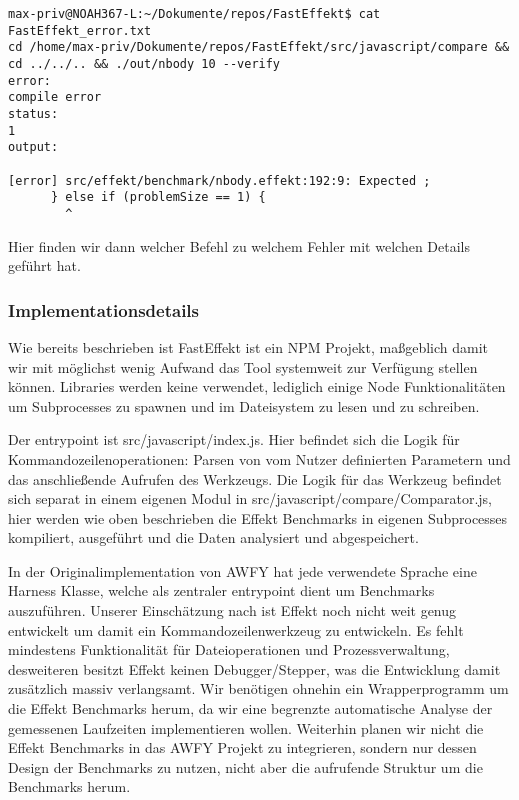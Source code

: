 \begin{lstlisting}
max-priv@NOAH367-L:~/Dokumente/repos/FastEffekt$ cat FastEffekt_error.txt 
cd /home/max-priv/Dokumente/repos/FastEffekt/src/javascript/compare && cd ../../.. && ./out/nbody 10 --verify 
error:
compile error
status:
1
output:

[error] src/effekt/benchmark/nbody.effekt:192:9: Expected ;
      } else if (problemSize == 1) {
        ^
\end{lstlisting}
Hier finden wir dann welcher Befehl zu welchem Fehler mit welchen Details geführt hat.

\subsubsection{Implementationsdetails}
Wie bereits beschrieben ist FastEffekt ist ein NPM Projekt, maßgeblich damit wir mit möglichst wenig Aufwand das Tool systemweit zur Verfügung stellen können.
Libraries werden keine verwendet, lediglich einige Node Funktionalitäten um Subprocesses zu spawnen und im Dateisystem zu lesen und zu schreiben.

Der entrypoint ist src/javascript/index.js. Hier befindet sich die Logik für Kommandozeilenoperationen: Parsen von vom Nutzer definierten Parametern und das anschließende Aufrufen des Werkzeugs.
Die Logik für das Werkzeug befindet sich separat in einem eigenen Modul in src/javascript/compare/Comparator.js, hier werden wie oben beschrieben die Effekt Benchmarks in eigenen Subprocesses kompiliert, ausgeführt und die Daten analysiert und abgespeichert.

In der Originalimplementation von AWFY hat jede verwendete Sprache eine Harness Klasse, welche als zentraler entrypoint dient um Benchmarks auszuführen.
Unserer Einschätzung nach ist Effekt noch nicht weit genug entwickelt um damit ein Kommandozeilenwerkzeug zu entwickeln. Es fehlt mindestens Funktionalität für Dateioperationen und Prozessverwaltung, desweiteren besitzt Effekt keinen Debugger/Stepper, was die Entwicklung damit zusätzlich massiv verlangsamt. Wir benötigen ohnehin ein Wrapperprogramm um die Effekt Benchmarks herum, da wir eine begrenzte automatische Analyse der gemessenen Laufzeiten implementieren wollen. Weiterhin planen wir nicht die Effekt Benchmarks in das AWFY Projekt zu integrieren, sondern nur dessen Design der Benchmarks zu nutzen, nicht aber die aufrufende Struktur um die Benchmarks herum.

